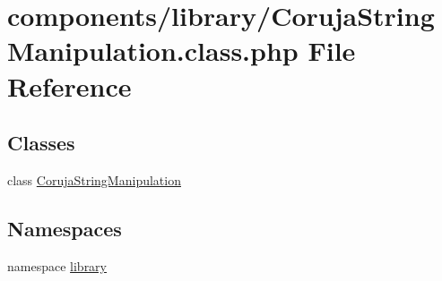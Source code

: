 \hypertarget{_coruja_string_manipulation_8class_8php}{
\section{components/library/CorujaStringManipulation.class.php File Reference}
\label{_coruja_string_manipulation_8class_8php}
}
\subsection*{Classes}
\begin{CompactItemize}
\item 
class \hyperlink{class_coruja_string_manipulation}{CorujaStringManipulation}
\end{CompactItemize}
\subsection*{Namespaces}
\begin{CompactItemize}
\item 
namespace \hyperlink{namespacelibrary}{library}
\end{CompactItemize}
